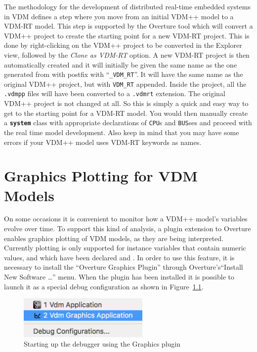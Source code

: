 \documentclass{overturerepchap}
\begin{document}
The methodology for the development of distributed real-time
embedded systems in VDM defines a step where you
move from an initial VDM++ model to a VDM-RT model\cite{Larsen&09b}. This
step is supported by the Overture tool which will convert
a VDM++ project to create the starting point for a new VDM-RT
project. This is done by right-clicking on the VDM++ project to be
converted in the Explorer view, followed by
the \emph{Clone as VDM-RT} option. A new VDM-RT project is then automatically
created and it will initially be given the same name as the one generated from 
with postfix with ``\texttt{\_VDM\_RT}''. It will have the
same name as the original VDM++ project, but with \texttt{VDM\_RT} appended.
Inside the project, all the \texttt{.vdmpp} files will have been converted
to a \texttt{.vdmrt} extension. The original VDM++ project is not
changed at all. So this is simply a quick and easy way to get to the
starting point for a VDM-RT model. You would then manually create
a {\textbf\texttt{system}} class with appropriate declarations of
\texttt{CPU}s and \texttt{BUS}ses and proceed with the real time
model development. Also keep in mind that you may have some errors
if your VDM++ model uses VDM-RT keywords as names.

\chapter{Graphics Plotting for VDM Models}\label{sec:graphics}

On some occasions it is convenient to monitor how a VDM++ model's
variables evolve over time. To support this kind of analysis, a plugin
extension to Overture enables graphics plotting of VDM models, as they
are being interpreted. Currently plotting is only supported for
instance variables that contain numeric values, and which have been
declared  and . In order to use this
feature, it is necessary to install the ``Overture Graphics Plugin''
through Overture's``Install New Software \ldots '' menu. When the
plugin has been installed it is possible to launch it as a special
debug configuration as shown in Figure~\ref{fig:graphicsdebug}.

\begin{figure}[htbp]
\begin{center}
\includegraphics[width=2.5in]{screenDumps/Graphicsdebug}
\caption{Starting up the debugger using the Graphics plugin\label{fig:graphicsdebug}}
\end{center}
\end{figure}
\end{document}

